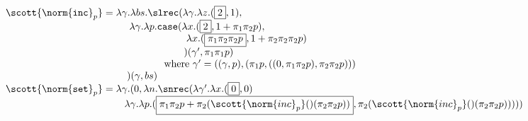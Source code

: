 \begin{small}
\[
\begin{array}{l}
\scott{\norm{\texttt{inc}}_p} = \lambda \gamma. \lambda bs. \slrec(\lambda \gamma.\lambda z. (\framebox{2},1),\\
\hspace{12.5em}     \lambda \gamma. \lambda  p. \texttt{case}(\lambda x. (\framebox{2}, 1 + \pi_1\pi_2 p),\\
\hspace{18.25em}                                               \lambda x. (\framebox{$\pi_1\pi_2 \pi_2 p$}, 1 +  \pi_2\pi_2 \pi_2 p)\\
\hspace{18em}                                              )(\gamma',\pi_1 \pi_1 p)\\
\hspace{16em} \text{where } \gamma' = ((\gamma,p),(\pi_1 p,((0,\pi_1\pi_2 p),\pi_2 \pi_2 p)))\\
\hspace{12.25em}       )(\gamma,bs)\\

\scott{\norm{\texttt{set}}_p} = \lambda \gamma. (0,\lambda n.\snrec(\lambda \gamma'.\lambda x.(\framebox{$0$},0)\\
\hspace{12em} \lambda \gamma. \lambda p. (\framebox{$\pi_1\pi_2p + \pi_2(\scott{\norm{inc}_p}()(\pi_2 \pi_2 p))$},\pi_2(\scott{\norm{inc}_p}()(\pi_2 \pi_2 p)))
))

\end{array}
\]
\end{small}
